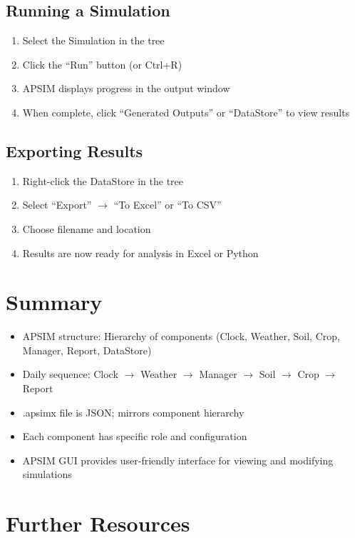 \subsection{Running a Simulation}

\begin{enumerate}
  \item Select the Simulation in the tree
  \item Click the ``Run'' button (or Ctrl+R)
  \item APSIM displays progress in the output window
  \item When complete, click ``Generated Outputs'' or ``DataStore'' to view results
\end{enumerate}

\subsection{Exporting Results}

\begin{enumerate}
  \item Right-click the DataStore in the tree
  \item Select ``Export'' $\to$ ``To Excel'' or ``To CSV''
  \item Choose filename and location
  \item Results are now ready for analysis in Excel or Python
\end{enumerate}

\section{Summary}

\begin{itemize}
  \item APSIM structure: Hierarchy of components (Clock, Weather, Soil, Crop, Manager, Report, DataStore)
  \item Daily sequence: Clock $\to$ Weather $\to$ Manager $\to$ Soil $\to$ Crop $\to$ Report
  \item .apsimx file is JSON; mirrors component hierarchy
  \item Each component has specific role and configuration
  \item APSIM GUI provides user-friendly interface for viewing and modifying simulations
\end{itemize}

\section{Further Resources}


